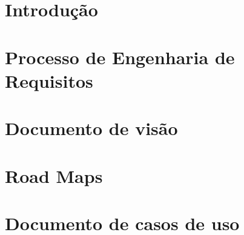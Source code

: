 
\section{Introdução} %
\label{sec:introdu_o}
 

\section{Processo de Engenharia de Requisitos}
\label{sec:processo}


\section{Documento de visão}
\label{sec:document_de_visao}


\section{Road Maps}
\label{sec:road_map}


\section{Documento de casos de uso}
\label{sec:documento_de_caso_de_uso}
